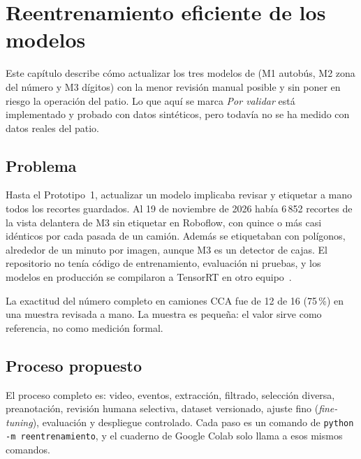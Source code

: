\chapter{Reentrenamiento eficiente de los modelos}
\label{cap:reentrenamiento}

Este capítulo describe cómo actualizar los tres modelos de \saru{}
(M1 autobús, M2 zona del número y M3 dígitos) con la menor revisión
manual posible y sin poner en riesgo la operación del patio. Lo que aquí
se marca \emph{Por validar} está implementado y probado con datos
sintéticos, pero todavía no se ha medido con datos reales del patio.

\section{Problema}

Hasta el Prototipo~1, actualizar un modelo implicaba revisar y etiquetar
a mano todos los recortes guardados. Al 19 de noviembre de 2026 había
6\,852 recortes de la vista delantera de M3 sin etiquetar en Roboflow,
con quince o más casi idénticos por cada pasada de un camión. Además se
etiquetaban con polígonos, alrededor de un minuto por imagen, aunque M3
es un detector de cajas. El repositorio no tenía código de
entrenamiento, evaluación ni pruebas, y los modelos en producción se
compilaron a TensorRT en otro equipo~\cite{tensorrt}.

\begin{aviso}
La exactitud del número completo en camiones CCA fue de 12 de 16
(75\,\%) en una muestra revisada a mano. La muestra es pequeña: el valor
sirve como referencia, no como medición formal.
\end{aviso}

\section{Proceso propuesto}

El proceso completo es: video, eventos, extracción, filtrado, selección
diversa, preanotación, revisión humana selectiva, dataset versionado,
ajuste fino (\emph{fine-tuning}), evaluación y despliegue controlado.
Cada paso es un comando de \texttt{python -m reentrenamiento}, y el
cuaderno de Google Colab solo llama a esos mismos comandos.

